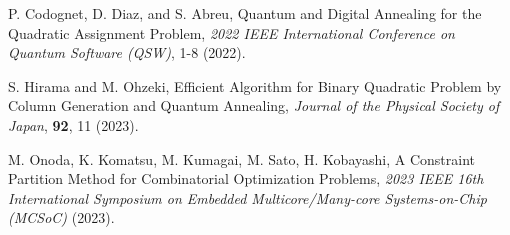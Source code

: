 \documentclass[submit,techrep,noauthor]{ipsj}
\begin{document}
\begin{thebibliography}{10}
P. Codognet, D. Diaz, and S. Abreu, Quantum and Digital Annealing for the Quadratic Assignment Problem, {\it 2022 IEEE International Conference on Quantum Software (QSW)}, 1-8 (2022).

S. Hirama and M. Ohzeki, Efficient Algorithm for Binary Quadratic Problem by Column Generation and Quantum Annealing, {\it Journal of the Physical Society of Japan}, {\bf 92}, 11 (2023).

M. Onoda, K. Komatsu, M. Kumagai, M. Sato, H. Kobayashi, A Constraint Partition Method for Combinatorial Optimization Problems, {\it 2023 IEEE 16th International Symposium on Embedded Multicore/Many-core Systems-on-Chip (MCSoC)} (2023).

\end{thebibliography}
\end{document}
